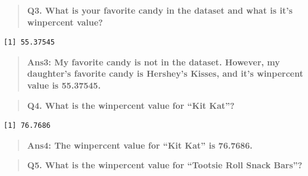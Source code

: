 \documentclass[
  letterpaper,
  DIV=11,
  numbers=noendperiod]{scrartcl}
\newenvironment{Shaded}{\begin{snugshade}}{\end{snugshade}}
\newcommand{\NormalTok}[1]{\textcolor[rgb]{0.00,0.23,0.31}{#1}}
\newcommand{\SpecialCharTok}[1]{\textcolor[rgb]{0.37,0.37,0.37}{#1}}
\newcommand{\StringTok}[1]{\textcolor[rgb]{0.13,0.47,0.30}{#1}}
\begin{document}
\begin{quote}
\textbf{Q3. What is your favorite candy in the dataset and what is it's
winpercent value?}
\end{quote}

\begin{Shaded}
\end{Shaded}

\begin{verbatim}
[1] 55.37545
\end{verbatim}

\begin{quote}
\textbf{Ans3: My favorite candy is not in the dataset. However, my
daughter's favorite candy is Hershey's Kisses, and it's winpercent value
is 55.37545.}
\end{quote}

\begin{quote}
\textbf{Q4. What is the winpercent value for ``Kit Kat''?}
\end{quote}

\begin{Shaded}
\end{Shaded}

\begin{verbatim}
[1] 76.7686
\end{verbatim}

\begin{quote}
\textbf{Ans4: The winpercent value for ``Kit Kat'' is 76.7686.}
\end{quote}

\begin{quote}
\textbf{Q5. What is the winpercent value for ``Tootsie Roll Snack
Bars''?}
\end{quote}

\begin{Shaded}
\end{Shaded}
\end{document}
